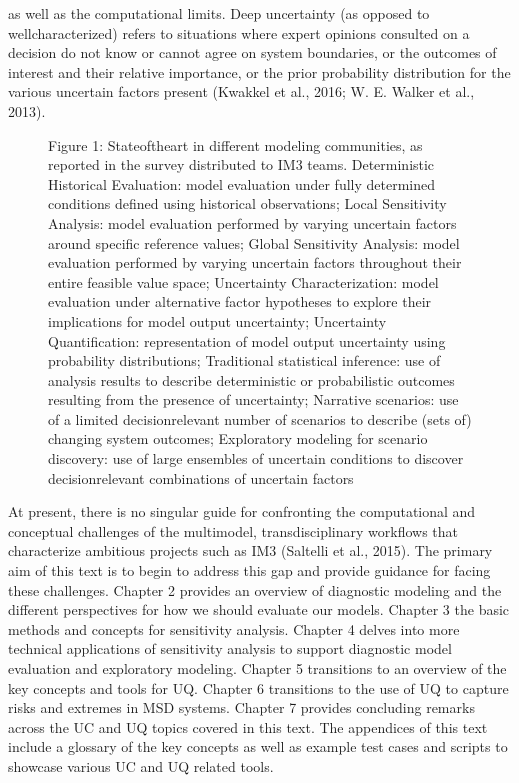 \documentclass[letterpaper,10pt,english]{sphinxmanual}
\let\sphinxpxdimen\pdfpxdimen\else\newdimen\sphinxpxdimen
\begin{document}
as well as the computational limits. Deep uncertainty (as opposed to well\sphinxhyphen{}characterized) refers to situations where expert opinions consulted on a decision do not know or cannot agree on system boundaries, or the outcomes of interest and their relative importance, or the prior probability distribution for the various uncertain factors present (Kwakkel et al., 2016; W. E. Walker et al., 2013).

\begin{figure}[htbp]
\centering
\capstart

\noindent\sphinxincludegraphics[width=700\sphinxpxdimen]{{figure1_state_of_the_science}.png}
\caption{Figure 1: State\sphinxhyphen{}of\sphinxhyphen{}the\sphinxhyphen{}art in different modeling communities, as reported in the survey distributed to IM3 teams. Deterministic Historical Evaluation: model evaluation under fully determined conditions defined using historical observations; Local Sensitivity Analysis: model evaluation performed by varying uncertain factors around specific reference values; Global Sensitivity Analysis: model evaluation performed by varying uncertain factors throughout their entire feasible value space; Uncertainty Characterization: model evaluation under alternative factor hypotheses to explore their implications for model output uncertainty; Uncertainty Quantification: representation of model output uncertainty using probability distributions; Traditional statistical inference: use of analysis results to describe deterministic or probabilistic outcomes resulting from the presence of uncertainty; Narrative scenarios: use of a limited decision\sphinxhyphen{}relevant number of scenarios to describe (sets of) changing system outcomes; Exploratory modeling for scenario discovery: use of large ensembles of uncertain conditions to discover decision\sphinxhyphen{}relevant combinations of uncertain factors}\label{\detokenize{1.0_Introduction:id1}}\end{figure}

\sphinxAtStartPar
At present, there is no singular guide for confronting the computational and conceptual challenges of the multi\sphinxhyphen{}model, transdisciplinary workflows that characterize ambitious projects such as IM3 (Saltelli et al., 2015). The primary aim of this text is to begin to address this gap and provide guidance for facing these challenges. Chapter 2 provides an overview of diagnostic modeling and the different perspectives for how we should evaluate our models. Chapter 3 the basic methods and concepts for sensitivity analysis. Chapter 4 delves into more technical applications of sensitivity analysis to support diagnostic model evaluation and exploratory modeling. Chapter 5 transitions to an overview of the key concepts and tools for UQ. Chapter 6 transitions to the use of UQ to capture risks and extremes in MSD systems. Chapter 7 provides concluding remarks across the UC and UQ topics covered in this text. The appendices of this text include a glossary of the key concepts as well as example test cases and scripts to showcase various UC and UQ related tools.
\end{document}
